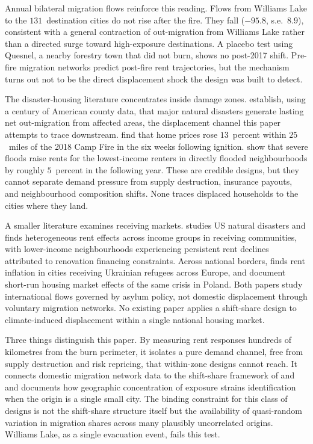 \documentclass[12pt]{article}
\begin{document}
Annual bilateral migration flows reinforce this reading. Flows from Williams Lake to
the $131$~destination cities do not rise after the fire. They fall ($-95.8$,
s.e.\ $8.9$), consistent with a general contraction of out-migration from Williams Lake
rather than a directed surge toward high-exposure destinations. A placebo test using
Quesnel, a nearby forestry town that did not burn, shows no post-2017 shift. Pre-fire migration networks predict post-fire rent
trajectories, but the mechanism turns out not to be the direct displacement shock
the design was built to detect.


\iffalse %
The disaster-housing literature concentrates inside damage zones. \citet{boustan2020}
establish, using a century of American county data, that major natural disasters generate
lasting net out-migration from affected areas, the displacement channel this paper
attempts to trace downstream.
\citet{hennighausen2024} find that home prices rose
$13$~percent within $25$~miles of the 2018 Camp Fire in the six weeks following ignition.
\citet{brennan2024} show that severe floods raise rents for the lowest-income renters in
directly flooded neighbourhoods by roughly $5$~percent in the following year. These are
credible designs, but they cannot separate demand pressure from supply destruction,
insurance payouts, and neighbourhood composition shifts. None traces displaced households
to the cities where they land.

A smaller literature examines receiving markets. \citet{harwood2026} studies US natural
disasters and finds heterogeneous rent effects across income groups in receiving
communities, with lower-income neighbourhoods experiencing persistent rent declines
attributed to renovation financing constraints. Across national borders,
\citet{czerniak2024} finds rent inflation in cities receiving Ukrainian refugees across Europe, and \citet{trojanek2022} document short-run housing market effects of the same crisis in Poland. Both papers study international flows governed by asylum policy, not
domestic displacement through voluntary migration networks. No existing paper applies a
shift-share design to climate-induced displacement within a single national housing
market.

Three things distinguish this paper. By measuring rent responses hundreds of kilometres
from the burn perimeter, it isolates a pure demand channel, free from supply destruction
and risk repricing, that within-zone designs cannot reach. It connects domestic migration
network data to the shift-share framework of \citet{goldsmith2020} and \citet{borusyak2022} and documents
how geographic concentration of exposure strains identification when
the origin is a single small city. The binding constraint for this class
of designs is not the shift-share structure itself but the availability of quasi-random
variation in migration shares across many plausibly uncorrelated origins. Williams Lake,
as a single evacuation event, fails this test.
\end{document}
